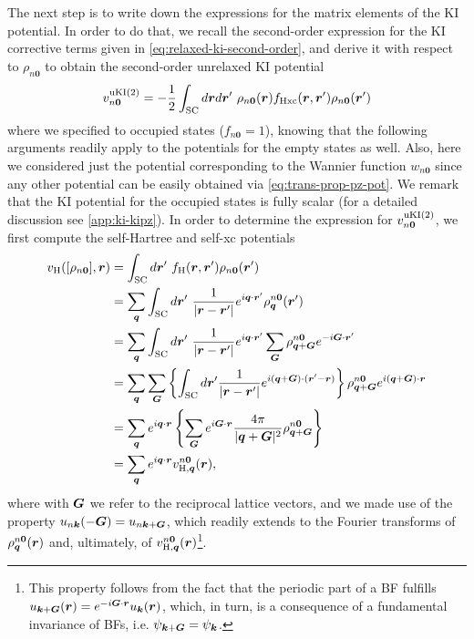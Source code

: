 The next step is to write down the expressions for the matrix elements of the KI potential. In order to do that, we recall the second-order expression for the KI corrective terms given in \cref{eq:relaxed-ki-second-order}, and derive it with respect to $\rho_{n{\bm 0}}$ to obtain the second-order unrelaxed KI potential
%
\begin{equation}
    v^{\rm uKI(2)}_{n{\bm 0}} = - \frac{1}{2} \int_{\rm SC} d{\bm r} d{\bm r}' \ \rho_{n{\bm 0}}({\bm r}) f_{\rm Hxc}({\bm r},{\bm r}') \rho_{n{\bm 0}}({\bm r}')
    \label{eq:ki-pot-second-order}
\end{equation}
%
where we specified to occupied states ($f_{n{\bm 0}} = 1$), knowing that the following arguments readily apply to the potentials for the empty states as well. Also, here we considered just the potential corresponding to the Wannier function $w_{n{\bm 0}}$ since any other potential can be easily obtained via \cref{eq:trans-prop-pz-pot}. We remark that the KI potential for the occupied states is fully scalar (for a detailed discussion see \cref{app:ki-kipz}). In order to determine the expression for $v^{\rm uKI(2)}_{n{\bm 0}}$, we first compute the self-Hartree and self-xc potentials
%
\begin{equation}
    \begin{split}
        v_{\rm H}([\rho_{n{\bm 0}}],{\bm r}) &= \int_{\rm SC} d{\bm r}' \ f_{\rm H}({\bm r},{\bm r}') \rho_{n{\bm 0}}({\bm r}') \\
        &= \sum_{{\bm q}} \int_{\rm SC} d{\bm r}' \ \frac{1}{|{\bm r} - {\bm r}'|} e^{i {\bm q} \cdot {\bm r}'} \rho_{{\bm q}}^{n{\bm 0}}({\bm r}') \\
        &= \sum_{{\bm q}} \int_{\rm SC} d{\bm r}' \ \frac{1}{|{\bm r} - {\bm r}'|} e^{i {\bm q} \cdot {\bm r}'} \sum_{{\bm G}} \rho_{{\bm q}+{\bm G}}^{n {\bm 0}} e^{-i {\bm G} \cdot {\bm r}'} \\
        &= \sum_{{\bm q}} \sum_{{\bm G}} \left\{ \int_{\rm SC} d{\bm r}' \frac{1}{|{\bm r} -{\bm r}'|} e^{i({\bm q}+{\bm G}) \cdot ({\bm r}'-{\bm r})} \right\} \rho_{{\bm q}+{\bm G}}^{n {\bm 0}} e^{i({\bm q}+{\bm G}) \cdot {\bm r}} \\
        &= \sum_{{\bm q}} e^{i {\bm q} \cdot {\bm r}} \left\{ \sum_{{\bm G}} e^{i {\bm G} \cdot {\bm r}} \frac{4\pi}{|{\bm q}+{\bm G}|^2} \rho_{{\bm q}+{\bm G}}^{n {\bm 0}} \right\} \\
        &= \sum_{{\bm q}} e^{i {\bm q} \cdot {\bm r}} v_{{\rm H},{\bm q}}^{n{\bm 0}}({\bm r}) ,
    \end{split}
    \label{eq:self-hartree-kcw}
\end{equation}
%
where with ${\bm G}$ we refer to the reciprocal lattice vectors, and we made use of the property $u_{n{\bm k}}(-{\bm G}) = u_{n{\bm k}+{\bm G}}$, which readily extends to the Fourier transforms of $\rho_{{\bm q}}^{n{\bm 0}}({\bm r})$ and, ultimately, of $v_{{\rm H},{\bm q}}^{n{\bm 0}}({\bm r})$\footnote{
This property follows from the fact that the periodic part of a BF fulfills $u_{{\bm k}+{\bm G}}({\bm r}) = e^{-i {\bm G} \cdot {\bm r}} u_{{\bm k}}({\bm r})$, which, in turn, is a consequence of a fundamental invariance of BFs, i.e. $\psi_{{\bm k}+{\bm G}} = \psi_{{\bm k}}$.
}. 
